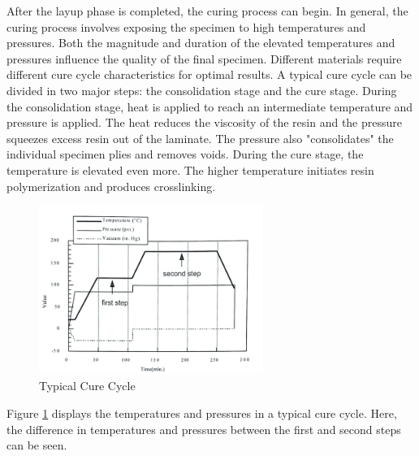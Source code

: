 After the layup phase is completed, the curing process can begin. In general, the curing process involves exposing the specimen to high temperatures and pressures. Both the magnitude and duration of the elevated temperatures and pressures influence the quality of the final specimen. Different materials require different cure cycle characteristics for optimal results. A typical cure cycle can be divided in two major steps: the consolidation stage and the cure stage. During the consolidation stage, heat is applied to reach an intermediate temperature and pressure is applied. The heat reduces the viscosity of the resin and the pressure squeezes excess resin out of the laminate. The pressure also "consolidates" the individual specimen plies and removes voids.  During the cure stage, the temperature is elevated even more. The higher temperature initiates resin polymerization and produces crosslinking. 

\begin{figure}[!h]
    \centering
    \includegraphics[width=0.65\textwidth]{Pictures/Lab1: Q 1.10/typical_cure.jpg}
    \caption{Typical Cure Cycle\cite{labmanual}}
    \label{fig:typicalcure}
\end{figure}

Figure \ref{fig:typicalcure} displays the temperatures and pressures in a typical cure cycle. Here, the difference in temperatures and pressures between the first and second steps can be seen. 